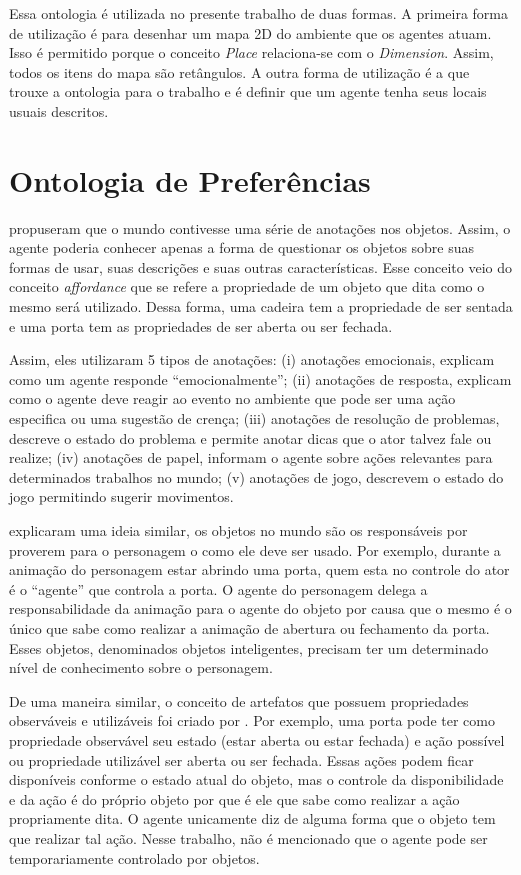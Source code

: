 Essa ontologia é utilizada no presente trabalho de duas formas. A primeira
forma de utilização é para desenhar um mapa 2D do ambiente que os agentes
atuam. Isso é permitido porque o conceito \emph{Place} relaciona-se com o
\emph{Dimension}. Assim, todos os itens do mapa são retângulos. A outra forma
de utilização é a que trouxe a ontologia para o trabalho e é definir que um
agente tenha seus locais usuais descritos.

\section{Ontologia de Preferências} \label{ch:aec:oda}

\citet{doyle1998annotated} propuseram que o mundo contivesse uma série de
anotações nos objetos. Assim, o agente poderia conhecer apenas a forma de
questionar os objetos sobre suas formas de usar, suas descrições e suas outras
características. Esse conceito veio do conceito \emph{affordance} que se
refere a propriedade de um objeto que dita como o mesmo será utilizado.
Dessa forma, uma cadeira tem a propriedade de ser sentada e uma porta tem as
propriedades de ser aberta ou ser fechada.

Assim, eles utilizaram 5 tipos de anotações: (i) anotações emocionais,
explicam como um agente responde ``emocionalmente''; (ii) anotações de
resposta, explicam como o agente deve reagir ao evento no ambiente que pode ser
uma ação especifica ou uma sugestão de crença; (iii) anotações de resolução de
problemas, descreve o estado do problema e permite anotar dicas que o ator
talvez fale ou realize; (iv) anotações de papel, informam o agente sobre ações
relevantes para determinados trabalhos no mundo; (v) anotações de jogo,
descrevem o estado do jogo permitindo sugerir movimentos.

\citet{kallmann1999modeling} explicaram uma ideia similar, os objetos no mundo
são os responsáveis por proverem para o personagem o como ele deve ser usado.
Por exemplo, durante a animação do personagem estar abrindo uma porta, quem esta
no controle do ator é o ``agente'' que controla a porta. O agente do
personagem delega a responsabilidade da animação para o agente do objeto por
causa que o mesmo é o único que sabe como realizar a animação de abertura ou
fechamento da porta. Esses objetos, denominados objetos inteligentes, precisam
ter um determinado nível de conhecimento sobre o personagem.

De uma maneira similar, o conceito de artefatos que possuem propriedades
observáveis e utilizáveis foi criado por \citet{ricci31cartago}. Por exemplo,
uma porta pode ter como propriedade observável seu estado (estar aberta ou
estar fechada) e ação possível ou propriedade utilizável ser aberta ou ser
fechada. Essas ações podem ficar disponíveis conforme o estado atual do
objeto, mas o controle da disponibilidade e da ação é do próprio objeto por
que é ele que sabe como realizar a ação propriamente dita. O agente unicamente
diz de alguma forma que o objeto tem que realizar tal ação. Nesse trabalho,
não é mencionado que o agente pode ser temporariamente controlado por
objetos.

